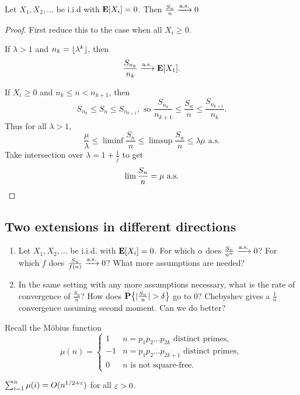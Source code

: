\begin{theorem} \label{thm:slln}
    Let $X_1, X_2, \dots$ be i.i.d with $\operatorname{\mathbf E}[X_i] = 0$.
    Then $\frac{S_n}{n} \xrightarrow{\text{a.s.}} 0$
\end{theorem}
\begin{proof}
    First reduce this to the case when all $X_i \ge 0$.

    If $\lambda > 1$ and $n_k = \lfloor\lambda^k\rfloor$, then \[
        \frac{S_{n_k}}{n_k} \xrightarrow{\text{a.s.}} \operatorname{\mathbf E}[X_1].
    \]

    If $X_i \ge 0$ and $n_k \le n < n_{k+1}$, then \[
        S_{n_k} \le S_n \le S_{n_{k+1}}, \text{ so }
        \frac{S_{n_k}}{n_{k+1}} \le \frac{S_n}n \le \frac{S_{n_{k+1}}}{n_k}.
    \]
    Thus for all $\lambda > 1$,
    \[
        \frac{\mu}{\lambda}
            \le \liminf \frac{S_n}n
            \le \limsup \frac{S_n}n
            \le \lambda \mu \text{ a.s.}
    \] Take intersection over $\lambda = 1 + \frac1j$ to get \[
        \lim \frac{S_n}n = \mu \text{ a.s.} \qedhere
    \]
\end{proof}

\subsection{Two extensions in different directions} \label{sec:slln:extend}
\begin{enumerate}
    \item Let $X_1, X_2, \dots$ be i.i.d. with $\operatorname{\mathbf E}[X_i] = 0$.
        For which $\alpha$ does $\frac{S_n}{n^\alpha} \xrightarrow{\text{a.s.}} 0$?
        For which $f$ does $\frac{S_n}{f(n)} \xrightarrow{\text{a.s.}} 0$?
        What more assumptions are needed?
    \item In the same setting with any more assumptions necessary,
        what is the rate of convergence of $\frac{S_n}{n}$?
        How does $\P\set*{\abs{\frac{S_n}{n}} > \delta}$ go to $0$?
        Chebyshev gives a $\frac1n$ convergence assuming second moment.
        Can we do better?
\end{enumerate}
Recall the M\"obius function \[
    \mu(n) = \begin{cases}
        1 & n = p_1p_2\dots p_{2k} \text{ distinct primes}, \\
        -1 & n = p_1p_2\dots p_{2k+1} \text{ distinct primes}, \\
        0 & n \text{ is not square-free}.
    \end{cases}
\]
\begin{claim} \label{thm:riemann}
    $\sum_{i=1}^n \mu(i) = O(n^{1/2 + \varepsilon})$ for all $\varepsilon > 0$.
\end{claim}

